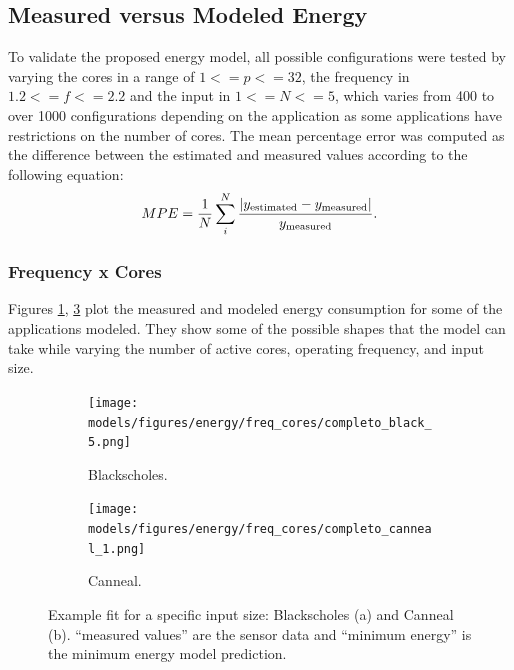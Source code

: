 \subsection{Measured versus Modeled Energy}
\label{sec:measuredversusmodeledenergy}

To validate the proposed energy model, all possible configurations were tested by varying the cores in a range of $1<=p<=32$, the frequency in $1.2<=f<=2.2$ and the input in $1<=N<=5$, which varies from 400 to over 1000 configurations depending on the application as some applications have restrictions on the number of cores. The mean percentage error was computed as the difference between the estimated and measured values according to the following equation:
\begin{equation}
MPE = \frac{1}{N} \sum_i^N \frac{|y_{\rm estimated}-y_{\rm measured}|}{y_{\rm measured}}.
\label{eq:mpe}
\end{equation}

\subsubsection{Frequency x Cores}
Figures \ref{fig:en_eq_black}, \ref{fig:en_eq_canneal} plot the measured and modeled energy consumption for some of the applications modeled. They  show some of the possible shapes that the model can take while varying the number of active cores, operating frequency, and input size.
\begin{figure}[H]
	\centering
	\begin{subfigure}[b]{0.48\textwidth}
		\centerline{\texttt{[image: models/figures/energy/freq\_cores/completo\_black\_5.png]}}
		\caption{Blackscholes.}
		\label{fig:en_eq_black}
	\end{subfigure}
	\begin{subfigure}[b]{0.48\textwidth}
		\centerline{\texttt{[image: models/figures/energy/freq\_cores/completo\_canneal\_1.png]}}
		\caption{Canneal.}
		\label{fig:en_eq_canneal}
	\end{subfigure}
	\caption{Example fit for a specific input size: Blackscholes (a) and Canneal (b).  “measured values” are the sensor data and “minimum energy” is the minimum energy model prediction.
	}
\end{figure}
